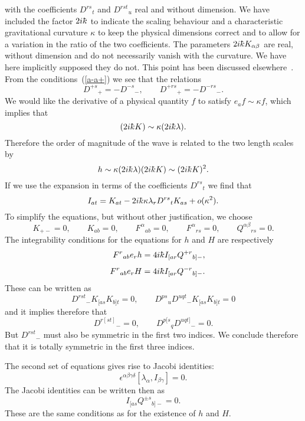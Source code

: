 \documentclass[12pt,a4paper]{article}
\newcounter{eg}
\def\kbar{{\mathchar'26\mkern-9muk}}
\begin{document}
with the coefficients $D^{rs}{}_t$ and $D^{rst}{}_u$ real and
without dimension. We have included the factor $2i\kbar$ to indicate
the scaling behaviour and a characteristic gravitational curvature
$\kappa$ to keep the physical dimensions correct and to allow for a
variation in the ratio of the two coefficients. The parameters
$2i\kbar K_{\alpha\beta}$ are real, without dimension and do not
necessarily vanish with the curvature.  We have here implicitly
supposed they do not. This point has been discussed
elsewhere~\cite{MacMadZou02}. From the conditions~(\ref{a-a+}) we see
that the relations
$$
D^{+s}{}_+ = - D^{-s}{}_-, \qquad
D^{+rs}{}_+ = - D^{-rs}{}_-.
$$
We would like the derivative of a physical quantity $f$ to satisfy
$e_a f \sim \kappa f$, which implies that 
$$
(2i\kbar K) \sim \kappa (2i\kbar\lambda).
$$ 
Therefore the order of magnitude of the wave is related to the two
length scales by
$$
h \sim \kappa (2i\kbar \lambda) (2i\kbar K) \sim (2i\kbar K)^2.
$$
If we use the expansion in terms of the coefficients $D^{rs}{}_t$ we
find that
$$
I_{at} = K_{at} - 
2i\kbar\kappa \lambda_r D^{rs}{}_t K_{as} + o(\kappa^2).
$$
To simplify the equations, but without other justification, we choose
$$
K_{+-} = 0, \qquad K_{ab} = 0,  \qquad F^\alpha{}_{ab} = 0,
\qquad F^\alpha{}_{rs} = 0,
\qquad Q^{\alpha\beta}{}_{rs} = 0.
$$ 
The integrability conditions for the equations for $h$ and $H$ are
respectively
\begin{eqnarray*}
&&F^r{}_{ab} e_r h = 4i\kbar I_{[ar} Q^{+r}{}_{b]-},\\[4pt]
&&F^r{}_{ab} e_r H = 4i\kbar I_{[ar} Q^{-r}{}_{b]-}.
\end{eqnarray*}
These can be written as 
$$
D^{rst}{}_- K_{[as} K_{b]t} = 0,\qquad
D^{ps}{}_u D^{uqt}{}_- K_{[as} K_{b]t} = 0
$$
and it implies therefore that
$$
D^{r[st]}{}_- = 0,\qquad D^{p[s}{}_q D^{uqt]}{}_- = 0.
$$
But $D^{rst}{}_-$ must also be symmetric in the first two
indices. We conclude therefore that it is totally symmetric in the
first three indices.

The second set of equations gives rise to Jacobi identities:
$$
\epsilon^{\alpha\beta\gamma\delta}[\lambda_\alpha, I_{\beta\gamma}] = 0.
$$
The Jacobi identities can be written then as
$$
I_{[as} Q^{\pm s}{}_{b]-} = 0.
$$ 
These are the same conditions as for the existence of $h$ and $H$.
\end{document}
